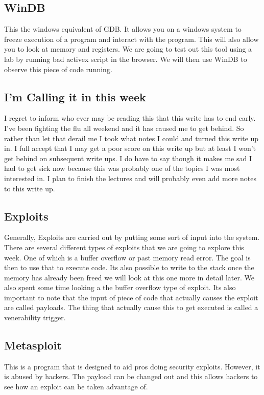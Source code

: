 \documentclass[letterpaper, onecolumn,10pt]{IEEEtran}
\begin{document}
		    \subsection{WinDB}
		    This the windows equivalent of GDB. It allows you on a windows system to freeze execution of a program and interact with the program. This will also allow you to look at memory and registers. We are going to test out this tool using a lab by running bad activex script in the browser. We will then use WinDB to observe this piece of code running.\\
		    
		    \subsection{I'm Calling it in this week}
		    I regret to inform who ever may be reading this that this write has to end early. I've been fighting the flu all weekend and it has caused me to get behind. So rather than let that derail me I took what notes I could and turned this write up in. I full accept that I may get a poor score on this write up but at least I won't get behind on subsequent write ups. I do have to say though it makes me sad I had to get sick now because this was probably one of the topics I was most interested in. I plan to finish the lectures and will probably even add more notes to this write up.\\
		    
		    \subsection{Exploits}
		    Generally, Exploits are carried out by putting some sort of input into the system. There are several different types of exploits that we are going to explore this week. One of which is a buffer overflow or past memory read error. The goal is then to use that to execute code. Its also possible to write to the stack once the memory has already been freed we will look at this one more in detail later. We also spent some time looking a the buffer overflow type of exploit. Its also important to note that the input of piece of code that actually causes the exploit are called payloads. The thing that actually cause this to get executed is called a venerability trigger.\\
		    
		    \subsection{Metasploit}
		    This is a program that is designed to aid pros doing security exploits. However, it is abused by hackers. The payload can be changed out and this allows hackers to see how an exploit can be taken advantage of.\\
		    
\end{document}
